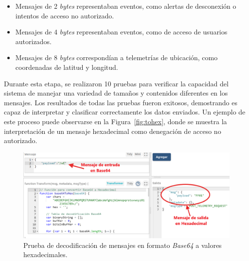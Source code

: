 \begin{itemize}
    \item Mensajes de 2 \textit{bytes} representaban eventos, como alertas de desconexión o intentos de acceso no autorizado.
    \item Mensajes de 4 \textit{bytes} representaban eventos, como de acceso de usuarios autorizados.    
    \item Mensajes de 8 \textit{bytes} correspondían a telemetrías de ubicación, como coordenadas de latitud y longitud.

\end{itemize}

Durante esta etapa, se realizaron 10 pruebas para verificar la capacidad del sistema de manejar una variedad de tamaños y contenidos diferentes en los mensajes. Los resultados de todas las pruebas fueron exitosos, demostrando es capaz de interpretar y clasificar correctamente los datos enviados. Un ejemplo de este proceso puede observarse en la Figura~\ref{fig:tohex}, donde se muestra la interpretación de un mensaje hexadecimal como denegación de acceso no autorizado.



\begin{figure}[H]
\leavevmode
\begin{minipage}{\textwidth}
\begin{center}
\includegraphics[scale=0.5]{./capitulo_05/imagen/resmon/64to (1).png}
\caption{Prueba de decodificación de mensajes en formato \textit{Base64} a valores hexadecimales.\label{fig:to64}}
\end{center}
\end{minipage}
\end{figure}



